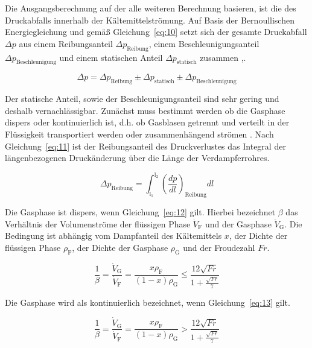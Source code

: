 Die Ausgangsberechnung auf der alle weiteren Berechnung basieren, ist die des Druckabfalls innerhalb der Kältemittelströmung. Auf Basis der Bernoullischen Energiegleichung und gemäß Gleichung~\ref{eq:10} setzt sich der gesamte Druckabfall $\Delta p$ aus einem Reibungsanteil $\Delta p_{\mathrm{Reibung}}$, einem Beschleunigungsanteil $\Delta p_{\mathrm{Beschleunigung}}$ und einem statischen Anteil $\Delta p_{\mathrm{statisch}}$ zusammen \cite{SpringerVerlagGmbH.2013},\cite{J.MichaelDoster.}.

\begin{equation}
\label{eq:10}
\Delta p =  \Delta p_{\mathrm{Reibung}} \pm \Delta p_{\mathrm{statisch}} \pm \Delta p_{\mathrm{Beschleunigung}}
\end{equation}

Der statische Anteil, sowie der Beschleunigungsanteil sind sehr gering und deshalb vernachlässigbar. Zunächst muss bestimmt werden ob die Gasphase dispers oder kontinuierlich ist, d.h. ob Gasblasen getrennt und verteilt in der Flüssigkeit transportiert werden oder zusammenhängend strömen \cite{Kesper.1976}. Nach Gleichung~\ref{eq:11} ist der Reibungsanteil des Druckverlustes das Integral der längenbezogenen Druckänderung über die Länge der Verdampferrohres.

\begin{equation}
\label{eq:11}
\Delta p_{\mathrm{Reibung}} = \int_{\mathrm{l_1}}^{\mathrm{l_2}} \left( \frac{dp}{dl} \right)_{\mathrm{Reibung}} dl
\end{equation}


Die Gasphase ist dispers, wenn Gleichung~\ref{eq:12} gilt. Hierbei bezeichnet $\beta$ das Verhältnis der Volumenströme der flüssigen Phase $\dot{V}_\mathrm{F}$ und der Gasphase $\dot{V}_\mathrm{G}$. Die Bedingung ist abhängig vom Dampfanteil des Kältemittels $x$, der Dichte der flüssigen Phase $\rho_\mathrm{F}$, der Dichte der Gasphase $\rho_\mathrm{G}$ und der Froudezahl $Fr$.

\begin{equation}
\label{eq:12}
\frac{1}{\beta} = \frac{\dot{V}_\mathrm{G}}{\dot{V}_\mathrm{F}} = \frac{x\rho_\mathrm{F}}{(1-x)\rho_\mathrm{G}} \leq \frac{12\sqrt{Fr}}{1+\frac{\sqrt{Fr}}{7}}
\end{equation}

Die Gasphase wird als kontinuierlich bezeichnet, wenn Gleichung~\ref{eq:13} gilt.

\begin{equation}
\label{eq:13}
\frac{1}{\beta} = \frac{\dot{V}_\mathrm{G}}{\dot{V}_\mathrm{F}} = \frac{x\rho_\mathrm{F}}{(1-x)\rho_\mathrm{G}} > \frac{12\sqrt{Fr}}{1+\frac{\sqrt{Fr}}{7}}
\end{equation}

